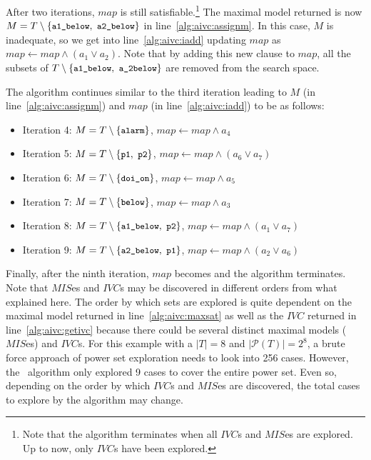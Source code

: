 After two iterations, $map$ is still satisfiable.\footnote{Note that the algorithm terminates when all $IVC$s and $MIS$es are explored. Up to now, only $IVC$s have been explored.} The maximal model returned is now $M = T \setminus \{ \small{ \texttt{a1\_below},~\texttt{a2\_below}}\}$ in line~\ref{alg:aivc:assignm}.
In this case, $M$ is inadequate, so we get into line~\ref{alg:aivc:iadd} updating $map$ as
$map \leftarrow map \wedge (a_1 \vee a_2)$. Note that by adding this new clause to $map$,
all the subsets of $T \setminus \{ \small{ \texttt{a1\_below},~\texttt{a\_2below}}\}$
are removed from the search space.

The algorithm continues similar to the third iteration leading to $M$ (in line~\ref{alg:aivc:assignm}) and $map$ (in line~\ref{alg:aivc:iadd}) to be as follows:
\begin{itemize}
  \item Iteration 4:  $M = T \setminus \{ \small{ \texttt{alarm}}\}$, $map \leftarrow map \wedge a_4$

  \item Iteration 5: $M = T \setminus \{ \small{ \texttt{p1},~\texttt{p2}}\}$, $map \leftarrow map \wedge (a_6 \vee a_7)$

  \item Iteration 6: $M = T \setminus \{ \small{ \texttt{doi\_on}}\}$, $map \leftarrow map \wedge a_5$

  \item Iteration 7: $M = T \setminus \{ \small{ \texttt{below}}\}$, $map \leftarrow map \wedge a_3$

  \item Iteration 8: $M = T \setminus \{ \small{ \texttt{a1\_below},~\texttt{p2}}\}$, $map \leftarrow map \wedge (a_1 \vee a_7)$

  \item Iteration 9: $M = T \setminus \{ \small{ \texttt{a2\_below},~\texttt{p1}}\}$, $map \leftarrow map \wedge (a_2 \vee a_6)$
\end{itemize}
Finally, after the ninth iteration, $map$ becomes \unsat and the algorithm terminates.
Note that $MIS$es and $IVC$s may be discovered in different orders from what explained here. The order by which sets are explored is
quite dependent on the maximal model returned in line~\ref{alg:aivc:maxsat} as well as the $IVC$ returned in line~\ref{alg:aivc:getivc} because there could be several distinct maximal models ($MIS$es) and $IVC$s. For this example with a $|T| = 8$ and $|\mathcal{P}(T)| = 2^8$, a brute force approach of power set exploration needs to look into  256 cases. However, the \aivcalg ~algorithm only explored 9 cases to cover the entire power set. Even so, depending on the order by which $IVC$s and $MIS$es are discovered, the total cases to explore by the algorithm may change.

